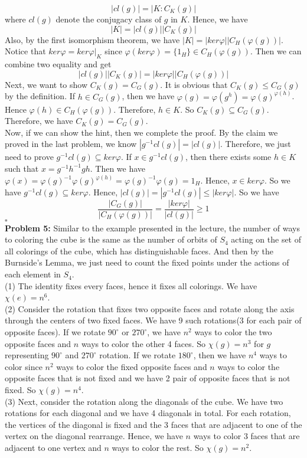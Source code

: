 \documentclass[12pt]{amsart}
\begin{document}
\[|cl(g)|=|K:C_K(g)|\]
where $cl(g)$ denote the conjugacy class of $g$ in $K$.
Hence, we have
\[|K|=|cl(g)||C_K(g)|\]
Also, by the first isomorphism theorem, we have $|K|=|ker\varphi||C_H(\varphi(g))|$. Notice that $ker\varphi=ker\varphi|_K$ since $\varphi(ker\varphi)=\{1_H\}\in C_H(\varphi(g))$. Then we can combine two equality and get
\[|cl(g)||C_K(g)|=|ker\varphi||C_H(\varphi(g))|\]
Next, we want to show $C_K(g)=C_G(g)$. It is obvious that $C_K(g)\leq C_G(g)$ by the definition. If $h\in C_G(g)$, then we have $\varphi(g)=\varphi(g^h)=\varphi(g)^{\varphi(h)}$. Hence $\varphi(h)\in C_H(\varphi(g))$. Therefore, $h\in K$. So $C_K(g)\subseteq C_G(g)$. Therefore, we have $C_K(g)=C_G(g)$.\\
Now, if we can show the hint, then we complete the proof. By the claim we proved in the last problem, we know $|g^{-1}cl(g)|=|cl(g)|$. Therefore, we just need to prove $g^{-1}cl(g)\subseteq ker\varphi$. If $x\in g^{-1}cl(g)$, then there exists some $h\in K$ such that $x=g^{-1}h^{-1}gh$. Then we have $\varphi(x)=\varphi(g)^{-1}\varphi(g)^{\varphi(h)}=\varphi(g)^{-1}\varphi(g)=1_H$. Hence, $x\in ker\varphi$. So we have $g^{-1}cl(g)\subseteq ker\varphi$. Hence, $|cl(g)|=|g^{-1}cl(g)|\leq |ker\varphi|$. So we have
\[\frac{|C_G(g)|}{|C_H(\varphi(g))|}=\frac{|ker\varphi|}{|cl(g)|}\geq 1\]
\phantom{qed}\hfill$\square$\\
\textbf{Problem 5:}
Similar to the example presented in the lecture, the number of ways to coloring the cube is the same as the number of orbits of $S_4$ acting on the set of all colorings of the cube, which has distinguishable faces. And then by the Burnside's Lemma, we just need to count the fixed points under the actions of each element in $S_4$.\\
(1) The identity fixes every faces, hence it fixes all colorings. We have $\chi(e)=n^6$.\\
(2) Consider the rotation that fixes two opposite faces and rotate along the axis through the centers of two fixed faces. We have 9 such rotations(3 for each pair of opposite faces). If we rotate $90^\circ $ or $270^\circ$, we have $n^2$ ways to color the two opposite faces and $n$ ways to color the other 4 faces. So $\chi(g)=n^3$ for $g$ representing $90^\circ $ and $270^\circ$ rotation. If we rotate $180^\circ$, then we have $n^4$ ways to color since $n^2$ ways to color the fixed opposite faces and $n$ ways to color the opposite faces that is not fixed and we have 2 pair of opposite faces that is not fixed. So $\chi(g)=n^4$.\\
(3) Next, consider the rotation along the diagonals of the cube. We have two rotations for each diagonal and we have 4 diagonals in total. For each rotation, the vertices of the diagonal is fixed and the 3 faces that are adjacent to one of the vertex on the diagonal rearrange. Hence, we have $n$ ways to color 3 faces that are adjacent to one vertex and $n$ ways to color the rest. So $\chi(g)=n^2$.\\
\end{document}
